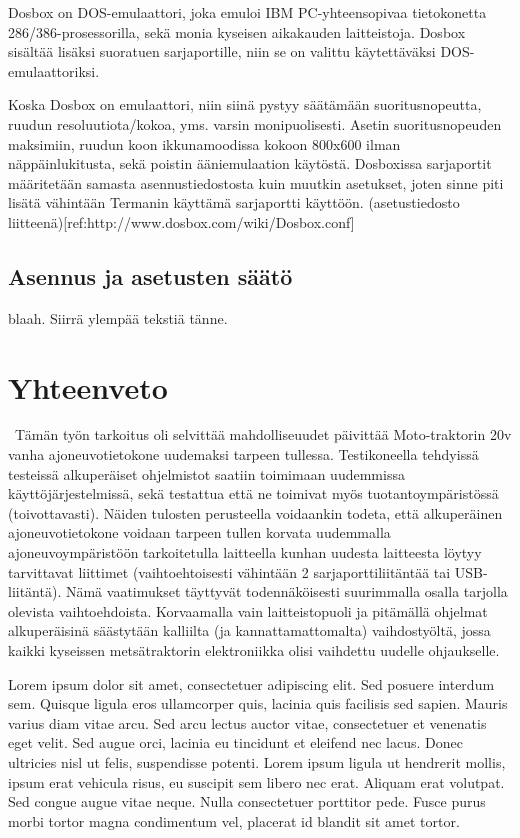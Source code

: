 \documentclass[11pt,a4paper,oneside,article]{memoir}
\begin{document}
Dosbox on DOS-emulaattori, joka emuloi IBM PC-yhteensopivaa tietokonetta
286/386-prosessorilla, sekä monia kyseisen aikakauden laitteistoja.
Dosbox sisältää lisäksi suoratuen sarjaportille, niin se on valittu
käytettäväksi DOS-emulaattoriksi.

Koska Dosbox on emulaattori, niin siinä pystyy säätämään
suoritusnopeutta, ruudun resoluutiota/kokoa, yms. varsin monipuolisesti.
Asetin suoritusnopeuden maksimiin, ruudun koon ikkunamoodissa kokoon
800x600 ilman näppäinlukitusta, sekä poistin ääniemulaation käytöstä.
Dosboxissa sarjaportit määritetään samasta asennustiedostosta kuin
muutkin asetukset, joten sinne piti lisätä vähintään Termanin käyttämä
sarjaportti käyttöön. (asetustiedosto
liitteenä){[}ref:http://www.dosbox.com/wiki/Dosbox.conf{]}

\section{Asennus ja asetusten säätö}
blaah. Siirrä ylempää tekstiä tänne.


\chapter{Yhteenveto}\
Tämän työn tarkoitus oli selvittää mahdolliseuudet päivittää
Moto-traktorin 20v vanha ajoneuvotietokone uudemaksi tarpeen tullessa.
Testikoneella tehdyissä testeissä alkuperäiset ohjelmistot saatiin
toimimaan uudemmissa käyttöjärjestelmissä, sekä testattua että ne
toimivat myös tuotantoympäristössä (toivottavasti). Näiden tulosten
perusteella voidaankin todeta, että alkuperäinen ajoneuvotietokone
voidaan tarpeen tullen korvata uudemmalla ajoneuvoympäristöön
tarkoitetulla laitteella kunhan uudesta laitteesta löytyy tarvittavat
liittimet (vaihtoehtoisesti vähintään 2 sarjaporttiliitäntää tai
USB-liitäntä). Nämä vaatimukset täyttyvät todennäköisesti suurimmalla
osalla tarjolla olevista vaihtoehdoista. Korvaamalla vain
laitteistopuoli ja pitämällä ohjelmat alkuperäisinä säästytään kalliilta
(ja kannattamattomalta) vaihdostyöltä, jossa kaikki kyseissen
metsätraktorin elektroniikka olisi vaihdettu uudelle ohjaukselle.

Lorem ipsum dolor sit amet, consectetuer adipiscing elit. Sed posuere interdum sem. Quisque ligula eros ullamcorper quis, lacinia quis facilisis sed sapien. Mauris varius diam vitae arcu. Sed arcu lectus auctor vitae, consectetuer et venenatis eget velit. Sed augue orci, lacinia eu tincidunt et eleifend nec lacus. Donec ultricies nisl ut felis, suspendisse potenti. Lorem ipsum ligula ut hendrerit mollis, ipsum erat vehicula risus, eu suscipit sem libero nec erat. Aliquam erat volutpat. Sed congue augue vitae neque. Nulla consectetuer porttitor pede. Fusce purus morbi tortor magna condimentum vel, placerat id blandit sit amet tortor.
\end{document}
